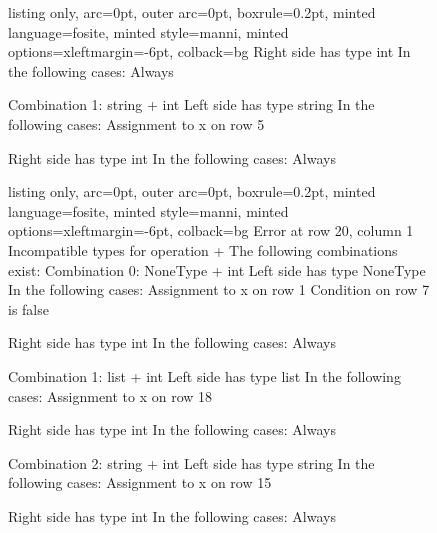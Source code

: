\begin{figure}[!h]
\begin{minipage}{\textwidth}
\begin{minipage}{0.5\textwidth}
\begin{tcblisting}{listing only, 
    arc=0pt,
    outer arc=0pt, 
    boxrule=0.2pt,
    minted language=fosite,
    minted style=manni,
    minted options={xleftmargin=-6pt},
    colback=bg }
  Right side has type int
  In the following cases:
   Always


 Combination 1: string + int
  Left side has type string
  In the following cases:
   Assignment to x on row 5

  Right side has type int
  In the following cases:
   Always

\end{tcblisting}
 \end{minipage}
 \begin{minipage}{0.5\textwidth}
  \begin{tcblisting}{listing only, 
    arc=0pt,
    outer arc=0pt, 
    boxrule=0.2pt,
    minted language=fosite,
    minted style=manni,
    minted options={xleftmargin=-6pt},
    colback=bg }
Error at row 20, column 1
 Incompatible types for operation +
 The following combinations exist:
 Combination 0: NoneType + int
  Left side has type NoneType
  In the following cases:
   Assignment to x on row 1
   Condition on row 7 is false

  Right side has type int
  In the following cases:
   Always


 Combination 1: list + int
  Left side has type list
  In the following cases:
   Assignment to x on row 18

  Right side has type int
  In the following cases:
   Always


 Combination 2: string + int
  Left side has type string
  In the following cases:
   Assignment to x on row 15

  Right side has type int
  In the following cases:
   Always
\end{tcblisting}
 \end{minipage}
 \end{minipage}
 \label{lst:break3}
\end{figure}